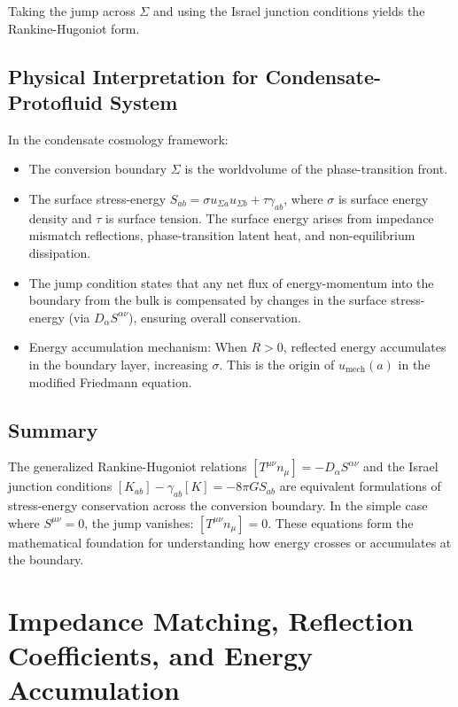 \documentclass[11pt,a4paper]{article}
\theoremstyle{definition}
\begin{document}
Taking the jump across $\Sigma$ and using the Israel junction conditions yields the Rankine-Hugoniot form.

\subsection{Physical Interpretation for Condensate-Protofluid System}
\label{app:RH_physical_interp}

In the condensate cosmology framework:
\begin{itemize}[leftmargin=1.8em]
  \item The conversion boundary $\Sigma$ is the worldvolume of the phase-transition front.
  \item The surface stress-energy $S_{ab} = \sigma u_{\Sigma a} u_{\Sigma b} + \tau \gamma_{ab}$, where $\sigma$ is surface energy density and $\tau$ is surface tension. The surface energy arises from impedance mismatch reflections, phase-transition latent heat, and non-equilibrium dissipation.
  \item The jump condition states that any net flux of energy-momentum into the boundary from the bulk is compensated by changes in the surface stress-energy (via $D_\alpha S^{\alpha\nu}$), ensuring overall conservation.
  \item Energy accumulation mechanism: When $R > 0$, reflected energy accumulates in the boundary layer, increasing $\sigma$. This is the origin of $u_{\mathrm{mech}}(a)$ in the modified Friedmann equation.
\end{itemize}

\subsection{Summary}
\label{app:RH_summary}

The generalized Rankine-Hugoniot relations $[T^{\mu\nu} n_\mu] = -D_\alpha S^{\alpha\nu}$ and the Israel junction conditions $[K_{ab}] - \gamma_{ab}[K] = -8\pi G S_{ab}$ are equivalent formulations of stress-energy conservation across the conversion boundary. In the simple case where $S^{\mu\nu} = 0$, the jump vanishes: $[T^{\mu\nu} n_\mu] = 0$. These equations form the mathematical foundation for understanding how energy crosses or accumulates at the boundary.


\section{Impedance Matching, Reflection Coefficients, and Energy Accumulation}
\label{app:impedance}
\end{document}
